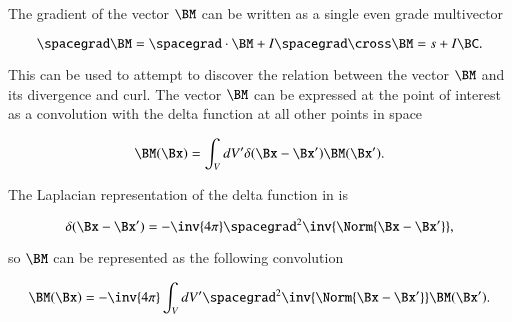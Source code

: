 %
%
The gradient of the vector \( \BM \) can be written as a single even grade multivector

\begin{equation}\label{eqn:helmholtzDerviationMultivectorSolution:60}
\spacegrad \BM
= \spacegrad \cdot \BM + I \spacegrad \cross \BM
= s + I \BC.
\end{equation}

%
%
%

This can be used to attempt to discover the relation between the vector \( \BM \) and its divergence and curl.
The vector \( \BM \) can be expressed at the point of interest as a convolution with the delta function at all other points in space

\begin{dmath}\label{eqn:helmholtzDerviationMultivectorSolution:80}
\BM(\Bx) = \int_V dV' \delta(\Bx - \Bx') \BM(\Bx').
\end{dmath}

The Laplacian representation of the delta function in  is

\begin{dmath}\label{eqn:helmholtzDerviationMultivectorSolution:100}
\delta(\Bx - \Bx') = -\inv{4\pi} \spacegrad^2 \inv{\Norm{\Bx - \Bx'}},
\end{dmath}

so \( \BM \) can be represented as the following convolution

\begin{dmath}\label{eqn:helmholtzDerviationMultivectorSolution:120}
\BM(\Bx) = -\inv{4\pi} \int_V dV' \spacegrad^2 \inv{\Norm{\Bx - \Bx'}} \BM(\Bx').
\end{dmath}

%
%

